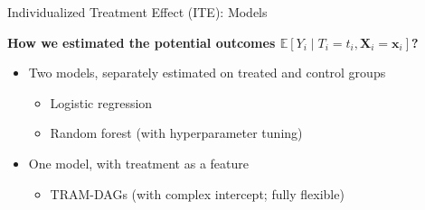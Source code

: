 \documentclass[onlytextwidth,english]{beamer}\usepackage[]{graphicx}\usepackage[]{xcolor}
\begin{document}
% 
% 
% 
% 
% 
% 
% 
% 



\begin{frame}{Individualized Treatment Effect (ITE): Models}


\textbf{How we estimated the potential outcomes $\mathbb{E}[Y_i \mid T_i = t_i, \mathbf{X}_i = \mathbf{x}_i]$?} 

\begin{itemize}
    \item {} Two models, separately estimated on treated and control groups
      \begin{itemize}
        \item Logistic regression
        \item Random forest (with hyperparameter tuning)
      \end{itemize}
    \item {} One model, with treatment as a feature
      \begin{itemize}
        \item TRAM-DAGs (with complex intercept; fully flexible)
      \end{itemize}
\end{itemize}


\end{frame}
\end{document}
